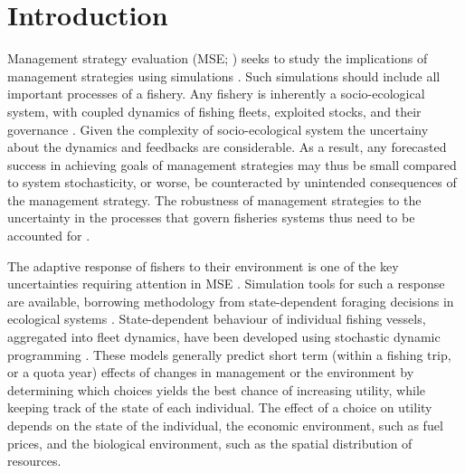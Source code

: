 \documentclass[12pt,oneline,a4paper,numbib]{ouparticle}
\numberwithin{equation}{subsection} %
\begin{document}
\maketitle

\section{Introduction}

Management strategy evaluation (MSE; \cite{Bunnefeld2011, Sainsbury2000, Smith1994}) seeks to study the implications of management strategies using simulations \cite{Punt2016}. Such simulations should include all important processes of a fishery. Any fishery is inherently a socio-ecological system, with coupled dynamics of fishing fleets, exploited stocks, and their governance \cite{Punt2016, Rasemeyer2007}. Given the complexity of socio-ecological system the uncertainy about the dynamics and feedbacks are considerable. As a result, any forecasted success in achieving goals of management strategies may thus be small compared to system stochasticity, or worse, be counteracted by unintended consequences of the management strategy. The robustness of management strategies to the uncertainty in the processes that govern fisheries systems thus need to be accounted for \cite{Andersen2010, Kell2007, Prellezo2016, Punt2016}. 

The adaptive response of fishers to their environment is one of the key uncertainties requiring attention in MSE \cite{Fulton2007}. Simulation tools for such a response are available, borrowing methodology from state-dependent foraging decisions in ecological systems \cite{ClarkandMangel2000,Houston1999}. State-dependent behaviour of individual fishing vessels, aggregated into fleet dynamics, have been developed using stochastic dynamic programming \cite{Alzorriz2018,Batsleer2015, Dowling2011, Poos2010, Gillis1995}. These models generally predict short term (within a fishing trip, or a quota year) effects of changes in management or the environment by determining which choices yields the best chance of increasing utility, while keeping track of the state of each individual. The effect of a choice on utility depends on the state of the individual, the economic environment, such as fuel prices, and the biological environment, such as the spatial distribution of resources. 
\end{document}
